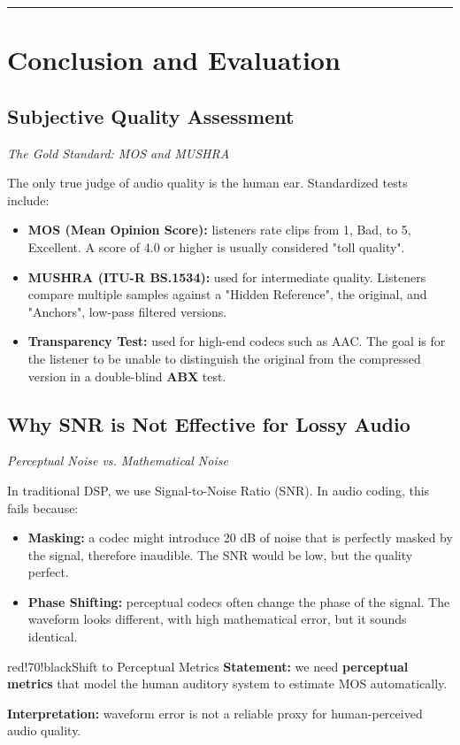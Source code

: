 \bigskip\hrule\bigskip
\section{Conclusion and Evaluation}

\subsection{Subjective Quality Assessment}

\textit{The Gold Standard: MOS and MUSHRA}

The only true judge of audio quality is the human ear. Standardized tests include:

\begin{itemize}
\item \textbf{MOS (Mean Opinion Score):} listeners rate clips from 1, Bad, to 5, Excellent. A score of 4.0 or higher is usually considered "toll quality".
\item \textbf{MUSHRA (ITU-R BS.1534):} used for intermediate quality. Listeners compare multiple samples against a "Hidden Reference", the original, and "Anchors", low-pass filtered versions.
\item \textbf{Transparency Test:} used for high-end codecs such as AAC. The goal is for the listener to be unable to distinguish the original from the compressed version in a double-blind \textbf{ABX} test.
\end{itemize}

\subsection{Why SNR is Not Effective for Lossy Audio}

\textit{Perceptual Noise vs. Mathematical Noise}

In traditional DSP, we use Signal-to-Noise Ratio (SNR). In audio coding, this fails because:

\begin{itemize}
\item \textbf{Masking:} a codec might introduce 20 dB of noise that is perfectly masked by the signal, therefore inaudible. The SNR would be low, but the quality perfect.
\item \textbf{Phase Shifting:} perceptual codecs often change the phase of the signal. The waveform looks different, with high mathematical error, but it sounds identical.
\end{itemize}

\begin{calloutbox}{red!70!black}{Shift to Perceptual Metrics}
\textbf{Statement:} we need \textbf{perceptual metrics} that model the human auditory system to estimate MOS automatically.

\textbf{Interpretation:} waveform error is not a reliable proxy for human-perceived audio quality.
\end{calloutbox}

